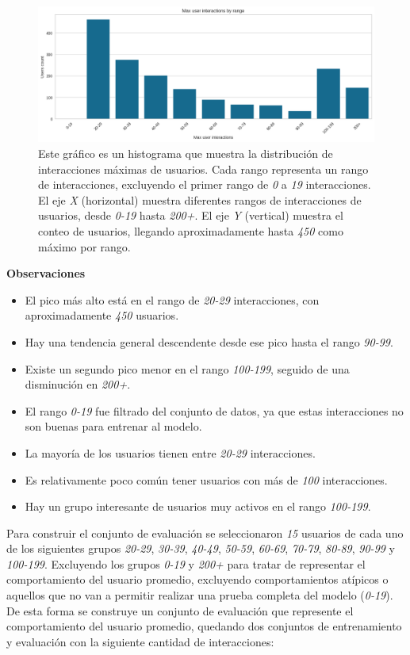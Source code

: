 \documentclass[11pt,a4paper,twoside]{thesis}
\begin{document}
\begin{figure}[h!]
	\centering
	\includegraphics[width=15cm]{./images/user_interactions.png}
	\caption{
		Este gráfico es un histograma que muestra la distribución de interacciones máximas de usuarios. Cada rango representa un rango de interacciones, excluyendo el primer rango de \textit{0} a \textit{19} interacciones. El eje \textit{X} (horizontal) muestra diferentes rangos de interacciones de usuarios, desde \textit{0-19} hasta \textit{200+}. El eje \textit{Y} (vertical) muestra el conteo de usuarios, llegando aproximadamente hasta \textit{450} como máximo por rango.
	}
	\label{fig:user-interactions}
\end{figure}

\textbf{Observaciones}
\begin{itemize}
	\item El pico más alto está en el rango de \textit{20-29} interacciones, con aproximadamente \textit{450} usuarios.
	\item Hay una tendencia general descendente desde ese pico hasta el rango \textit{90-99}.
	\item Existe un segundo pico menor en el rango \textit{100-199}, seguido de una disminución en \textit{200+}.
	\item El rango \textit{0-19} fue filtrado del conjunto de datos, ya que estas interacciones no son buenas para entrenar al modelo.
	\item La mayoría de los usuarios tienen entre \textit{20-29} interacciones.
	\item Es relativamente poco común tener usuarios con más de \textit{100} interacciones.
	\item Hay un grupo interesante de usuarios muy activos en el rango \textit{100-199}.
\end{itemize}

Para construir el conjunto de evaluación se seleccionaron \textit{15} usuarios de cada uno de los siguientes grupos
\textit{20-29}, \textit{30-39}, \textit{40-49}, \textit{50-59}, \textit{60-69}, \textit{70-79}, \textit{80-89}, \textit{90-99} y \textit{100-199}. Excluyendo los grupos \textit{0-19} y \textit{200+} para tratar de representar el comportamiento del usuario promedio, excluyendo comportamientos atípicos o aquellos que no van a permitir realizar una prueba completa del modelo (\textit{0-19}). De esta forma se construye un conjunto de evaluación que represente el comportamiento del usuario promedio, quedando dos conjuntos de entrenamiento y evaluación con la siguiente cantidad de interacciones:
\end{document}
